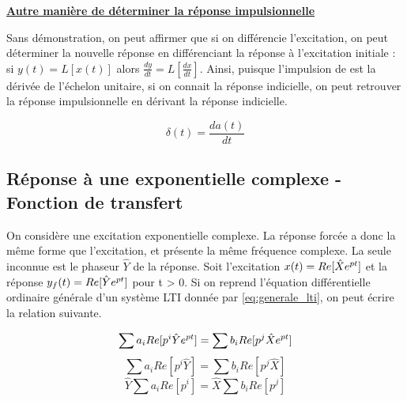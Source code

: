 \begin{remark}{}
	\vspace{0.5\baselineskip}
	
	\textbf{\underline{Autre manière de déterminer la réponse
            impulsionnelle}}
	
	Sans démonstration, on peut affirmer que si on différencie
        l'excitation, on peut déterminer la nouvelle réponse en
        différenciant la réponse à l'excitation initiale : si
        $y(t) = L[x(t)]$ alors $\frac{dy}{dt} = L[\frac{dx}{dt}] $.
        Ainsi, puisque l'impulsion de \Dirac{} est la dérivée de
        l'échelon unitaire, si on connait la réponse indicielle, on
        peut retrouver la réponse impulsionnelle en dérivant la
        réponse indicielle.
	
	\begin{equation}\label{key}
          \delta(t)=\frac{da(t)}{dt}
	\end{equation}
	
	\vspace{0.5\baselineskip}
	
	
	\subsection{Réponse à une exponentielle complexe - Fonction de transfert}
	On considère une excitation exponentielle complexe. La réponse
        forcée a donc la même forme que l'excitation, et présente la
        même fréquence complexe. La seule inconnue est le phaseur
        $\hat{Y}$ de la réponse. Soit l'excitation
        $ x(t) = Re[\hat{X}  e^{pt}]$ et la réponse
        $ y_{f}(t) = Re[\hat{Y}  e^{pt}]$ pour t > 0. Si on
        reprend l'équation différentielle ordinaire générale d'un
        système LTI donnée par \ref{eq:generale_lti}, on peut
        écrire la relation suivante.
	
	\begin{equation*}\label{}
          \sum a_{i}  Re[p^{i}  \hat{Y}  e^{pt}] = \sum b_{i}  Re[p^{j}  \hat{X}  e^{pt}]
	\end{equation*}
	\begin{equation*}\label{}
          \sum a_{i}  Re[p^{i}  \hat{Y}] = \sum b_{i}  Re[p^{j}  \hat{X}]
	\end{equation*}
	\begin{equation*}\label{}
          \hat{Y}  \sum a_{i}  Re[p^{i}] = \hat{X}  \sum b_{i}  Re[p^{j}]
	\end{equation*}
	

\end{remark}

